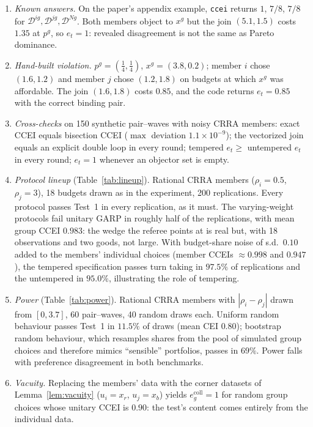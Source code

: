 \documentclass[11pt]{article}
\theoremstyle{remark}
\begin{document}
\begin{enumerate}[leftmargin=1.6em]
\item[A.] \emph{Known answers.} On the paper's appendix example, \texttt{ccei} returns $1$, $7/8$, $7/8$ for $\mathcal{D}^{ig},\mathcal{D}^{jg},\mathcal{D}^{Ng}$. Both members object to $x^g$ but the join $(5.1,1.5)$ costs $1.35$ at $p^g$, so $e_t=1$: revealed disagreement is not the same as Pareto dominance.
\item[B.] \emph{Hand-built violation.} $p^g=(\tfrac14,\tfrac14)$, $x^g=(3.8,0.2)$; member $i$ chose $(1.6,1.2)$ and member $j$ chose $(1.2,1.8)$ on budgets at which $x^g$ was affordable. The join $(1.6,1.8)$ costs $0.85$, and the code returns $e_t=0.85$ with the correct binding pair.
\item[C.] \emph{Cross-checks} on 150 synthetic pair--waves with noisy CRRA members: exact CCEI equals bisection CCEI ($\max$ deviation $1.1\times 10^{-9}$); the vectorized join equals an explicit double loop in every round; tempered $e_t\ge$ untempered $e_t$ in every round; $e_t=1$ whenever an objector set is empty.
\item[D.] \emph{Protocol lineup} (Table~\ref{tab:lineup}). Rational CRRA members ($\rho_i=0.5$, $\rho_j=3$), 18 budgets drawn as in the experiment, 200 replications. Every protocol passes Test~1 in every replication, as it must. The varying-weight protocols fail unitary GARP in roughly half of the replications, with mean group CCEI $0.983$: the wedge the referee points at is real but, with 18 observations and two goods, not large. With budget-share noise of s.d.\ $0.10$ added to the members' individual choices (member CCEIs $\approx 0.998$ and $0.947$), the tempered specification passes turn taking in $97.5\%$ of replications and the untempered in $95.0\%$, illustrating the role of tempering.
\item[E.] \emph{Power} (Table~\ref{tab:power}). Rational CRRA members with $|\rho_i-\rho_j|$ drawn from $[0,3.7]$, 60 pair--waves, 40 random draws each. Uniform random behaviour passes Test~1 in $11.5\%$ of draws (mean CEI $0.80$); bootstrap random behaviour, which resamples shares from the pool of simulated group choices and therefore mimics ``sensible'' portfolios, passes in $69\%$. Power falls with preference disagreement in both benchmarks.
\item[F.] \emph{Vacuity.} Replacing the members' data with the corner datasets of Lemma~\ref{lem:vacuity} ($u_i=x_r$, $u_j=x_b$) yields $e^{\mathrm{coll}}_g=1$ for random group choices whose unitary CCEI is $0.90$: the test's content comes entirely from the individual data.
\end{enumerate}
\end{document}
